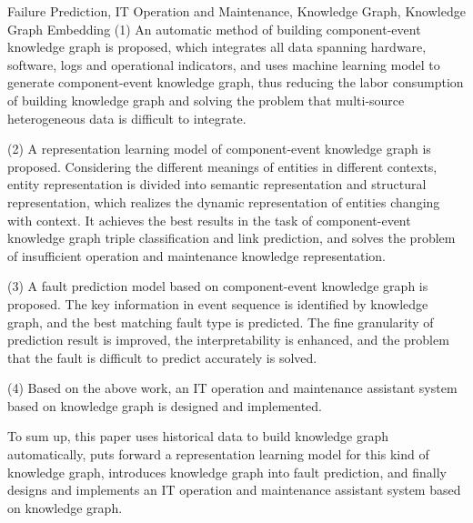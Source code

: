 \begin{englishabstract}{Failure Prediction, IT Operation and Maintenance, Knowledge Graph, Knowledge Graph Embedding}
(1) An automatic method of building component-event knowledge graph is proposed, which integrates all data spanning hardware, software, logs and operational indicators, and uses machine learning model to generate component-event knowledge graph, thus reducing the labor consumption of building knowledge graph and solving the problem that multi-source heterogeneous data is difficult to integrate. 

(2) A representation learning model of component-event knowledge graph is proposed. Considering the different meanings of entities in different contexts, entity representation is divided into semantic representation and structural representation, which realizes the dynamic representation of entities changing with context. It achieves the best results in the task of component-event knowledge graph triple classification and link prediction, and solves the problem of insufficient operation and maintenance knowledge representation. 

(3) A fault prediction model based on component-event knowledge graph is proposed. The key information in event sequence is identified by knowledge graph, and the best matching fault type is predicted. The fine granularity of prediction result is improved, the interpretability is enhanced, and the problem that the fault is difficult to predict accurately is solved. 

(4) Based on the above work, an IT operation and maintenance assistant system based on knowledge graph is designed and implemented. 

To sum up, this paper uses historical data to build knowledge graph automatically, puts forward a representation learning model for this kind of knowledge graph, introduces knowledge graph into fault prediction, and finally designs and implements an IT operation and maintenance assistant system based on knowledge graph.
\end{englishabstract}
\cleardoublepage


\cleardoublepage
\tableofcontents
\cleardoublepage
\listofothers
\cleardoublepage
      
